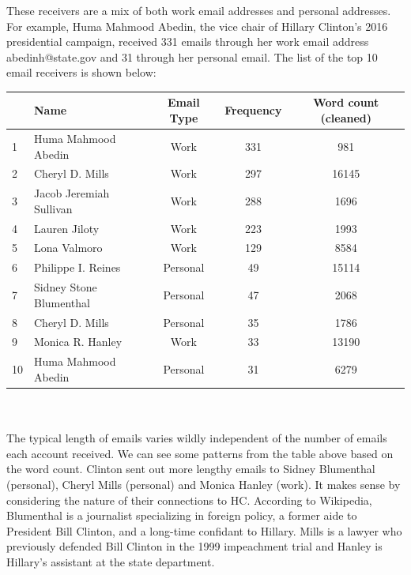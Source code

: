 These receivers are a mix of both work email addresses and personal addresses. For example, Huma Mahmood Abedin, the vice chair of Hillary Clinton's 2016 presidential campaign, received 331 emails through her work email address abedinh@state.gov and 31 through her personal email. 
The list of the top 10 email receivers is shown below:
\begin{center}
  \begin{tabular}{ |l| l | c | c |c|}
    \hline
    &Name & Email Type & Frequency & Word count (cleaned)\\ \hline
    1&Huma Mahmood Abedin & Work & 331 & 981 \\ \hline
    2&Cheryl D. Mills & Work & 297 &16145 \\ \hline
    3&Jacob Jeremiah Sullivan & Work & 288 & 1696\\ \hline
    4&Lauren Jiloty & Work & 223 &1993\\ \hline
    5&Lona Valmoro & Work & 129 &8584\\ \hline
    6&Philippe I. Reines & Personal & 49 &15114\\ \hline
    7&Sidney Stone Blumenthal & Personal & 47 &2068\\ \hline
    8&Cheryl D. Mills & Personal & 35 &1786\\ \hline
    9&Monica R. Hanley & Work & 33 &13190\\ \hline
    10&Huma Mahmood Abedin & Personal & 31&6279 \\
    \hline
  \end{tabular}
\end{center}
\\\\
The typical length of emails varies wildly independent of the number of emails each account received. We can see some patterns from the table above based on the word count. Clinton sent out more lengthy emails to Sidney Blumenthal (personal), Cheryl Mills (personal) and Monica Hanley (work). It makes sense by considering the nature of their connections to HC. 
According to Wikipedia, Blumenthal is a journalist specializing in foreign policy, a former aide to President Bill Clinton, and a long-time confidant to Hillary. Mills is a lawyer who previously defended Bill Clinton in the 1999 impeachment trial and Hanley is Hillary's assistant at the state department.

